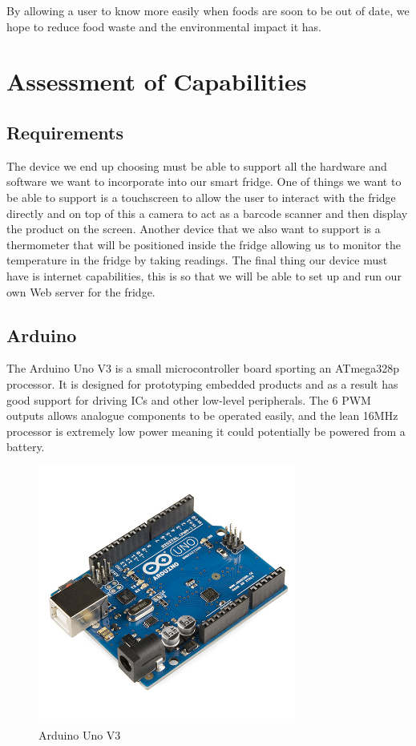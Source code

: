 \documentclass[10pt]{article}
\begin{document}

By allowing a user to know more easily when foods are soon to be out of date, we hope to reduce food waste and the environmental impact it has.

\newpage
\section{Assessment of Capabilities}

\subsection{Requirements}

The device we end up choosing must be able to support all the hardware and software we want to incorporate into our smart fridge. One of things we want to be able to support is a touchscreen to allow the user to interact with the fridge directly and on top of this a camera to act as a barcode scanner and then display the product on the screen. Another device that we also want to support is a thermometer that will be positioned inside the fridge allowing us to monitor the temperature in the fridge by taking readings. The final thing our device must have is internet capabilities, this is so that we will be able to set up and run our own Web server for the fridge.

\subsection{Arduino}
The Arduino Uno V3 is a small microcontroller board sporting an ATmega328p processor. It is designed for prototyping embedded products and as a result has good support for driving ICs and other low-level peripherals. The 6 PWM outputs allows analogue components to be operated easily, and the lean 16MHz processor is extremely low power meaning it could potentially be powered from a battery.

\begin{figure}[h]
\centering
\caption{Arduino Uno V3}
\label{Arduino Uno V3}
\includegraphics[height=8.5cm]{images/Arduino.jpg}
\end{figure}
\end{document}
